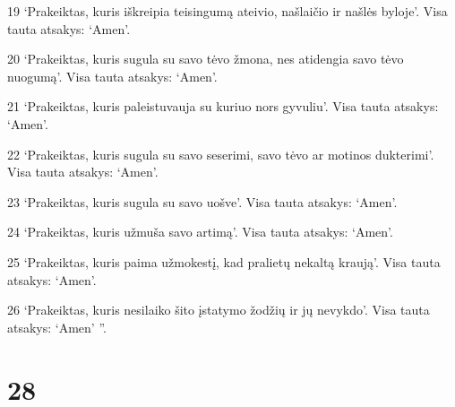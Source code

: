 \par 19 ‘Prakeiktas, kuris iškreipia teisingumą ateivio, našlaičio ir našlės byloje’. Visa tauta atsakys: ‘Amen’. 
\par 20 ‘Prakeiktas, kuris sugula su savo tėvo žmona, nes atidengia savo tėvo nuogumą’. Visa tauta atsakys: ‘Amen’. 
\par 21 ‘Prakeiktas, kuris paleistuvauja su kuriuo nors gyvuliu’. Visa tauta atsakys: ‘Amen’. 
\par 22 ‘Prakeiktas, kuris sugula su savo seserimi, savo tėvo ar motinos dukterimi’. Visa tauta atsakys: ‘Amen’. 
\par 23 ‘Prakeiktas, kuris sugula su savo uošve’. Visa tauta atsakys: ‘Amen’. 
\par 24 ‘Prakeiktas, kuris užmuša savo artimą’. Visa tauta atsakys: ‘Amen’. 
\par 25 ‘Prakeiktas, kuris paima užmokestį, kad pralietų nekaltą kraują’. Visa tauta atsakys: ‘Amen’. 
\par 26 ‘Prakeiktas, kuris nesilaiko šito įstatymo žodžių ir jų nevykdo’. Visa tauta atsakys: ‘Amen’ ”.



\chapter{28}


